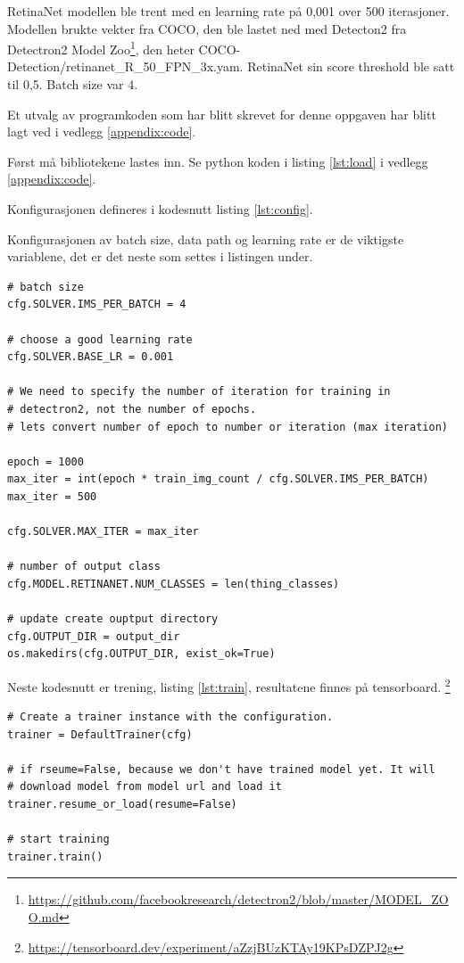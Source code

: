 RetinaNet modellen ble trent med en learning rate på 0,001 over 500 iterasjoner. Modellen brukte vekter fra COCO, den ble lastet ned med Detecton2 fra Detectron2 Model Zoo\footnote{\url{https://github.com/facebookresearch/detectron2/blob/master/MODEL_ZOO.md}}, den heter COCO-Detection/retinanet\_R\_50\_FPN\_3x.yam. RetinaNet sin score threshold ble satt til 0,5. Batch size var 4.

Et utvalg av programkoden som har blitt skrevet for denne oppgaven har blitt lagt ved i vedlegg \ref{appendix:code}.

Først må bibliotekene lastes inn. Se python koden i listing \ref{lst:load} i vedlegg \ref{appendix:code}.

Konfigurasjonen defineres i kodesnutt listing \ref{lst:config}.

Konfigurasjonen av batch size, data path og learning rate er de viktigste variablene, det er det neste som settes i listingen under. 

\begin{verbatim}
# batch size
cfg.SOLVER.IMS_PER_BATCH = 4

# choose a good learning rate
cfg.SOLVER.BASE_LR = 0.001

# We need to specify the number of iteration for training in
# detectron2, not the number of epochs.
# lets convert number of epoch to number or iteration (max iteration)

epoch = 1000
max_iter = int(epoch * train_img_count / cfg.SOLVER.IMS_PER_BATCH)
max_iter = 500

cfg.SOLVER.MAX_ITER = max_iter

# number of output class
cfg.MODEL.RETINANET.NUM_CLASSES = len(thing_classes)

# update create ouptput directory
cfg.OUTPUT_DIR = output_dir
os.makedirs(cfg.OUTPUT_DIR, exist_ok=True)
\end{verbatim}

Neste kodesnutt er trening, listing \ref{lst:train}, resultatene finnes på tensorboard.
\footnote{\url{https://tensorboard.dev/experiment/aZzjBUzKTAy19KPsDZPJ2g}}

\begin{verbatim}
# Create a trainer instance with the configuration.
trainer = DefaultTrainer(cfg) 

# if rseume=False, because we don't have trained model yet. It will
# download model from model url and load it
trainer.resume_or_load(resume=False)

# start training
trainer.train()
\end{verbatim}

